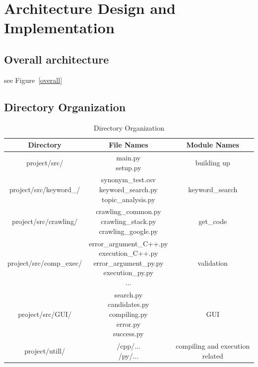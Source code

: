\documentclass[conference]{IEEEtran}
\begin{document}
\section{Architecture Design and Implementation} %
\label{sec:architecture_design_and_implementation}

\subsection{Overall architecture} %
\label{sub:overall_architecture}

see Figure~\ref{overall}


\subsection{Directory Organization} %
\label{sub:directory_organization}

\begin{table}[h]
\renewcommand{\arraystretch}{1.3}
\caption{Directory Organization}
\label{table:directory_org}
\centering
\begin{adjustbox}{width=0.5\textwidth}
\small
\begin{tabular}{c||c||c}
\hline
\bfseries Directory & \bfseries File Names & \bfseries Module Names \\
\hline\hline
project/src/  & \parbox[t]{5cm}{main.py \\ setup.py} & \parbox[t]{5cm}{building up}\\
\hline
project/src/keyword\_/  & \parbox[t]{5cm}{synonym\_test.csv \\ keyword\_search.py \\ topic\_analysis.py} & \parbox[t]{5cm}{keyword\_search}\\
\hline
project/src/crawling/ & \parbox[t]{5cm}{crawling\_common.py \\ crawling\_stack.py \\ crawling\_google.py} & \parbox[t]{5cm}{get\_code}\\
\hline
project/src/comp\_exec/ &\parbox[t]{5cm}{error\_argument\_C++.py \\ execution\_C++.py \\ error\_argument\_py.py \\ execution\_py.py \\ ... } & \parbox[t]{5cm}{validation}\\
\hline
project/src/GUI/ & \parbox[t]{5cm}{search.py \\candidates.py \\ compiling.py \\ error.py \\ success.py} & \parbox[t]{5cm}{GUI}\\
\hline
project/utill/  & \parbox[t]{5cm}{/cpp/... \\ /py/...} & \parbox[t]{5cm}{compiling and execution related}\\
\hline

\end{tabular}
\end{adjustbox}
\end{table}
\end{document}
